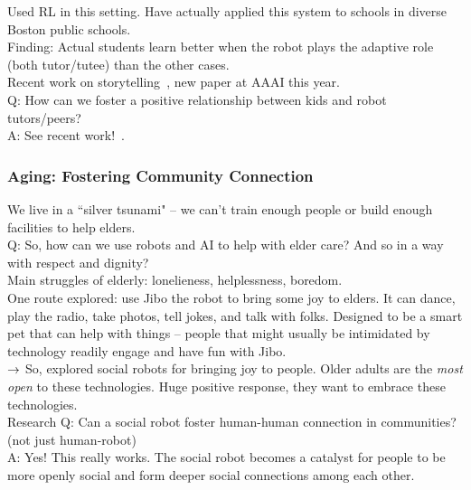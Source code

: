 Used RL in this setting. Have actually applied this system to schools in diverse Boston public schools. \\

Finding: Actual students learn better when the robot plays the adaptive role (both tutor/tutee) than the other cases. \\

Recent work on storytelling~\cite{park2017telling}, new paper at AAAI this year. \\

Q: How can we foster a positive relationship between kids and robot tutors/peers? \\

A: See recent work!~\cite{westlund2018measuring}.


\subsubsection{Aging: Fostering Community Connection}

We live in a ``silver tsunami" -- we can't train enough people or build enough facilities to help elders. \\

Q: So, how can we use robots and AI to help with elder care? And so in a way with respect and dignity? \\

Main struggles of elderly: lonelieness, helplessness, boredom. \\

One route explored: use Jibo the robot to bring some joy to elders. It can dance, play the radio, take photos, tell jokes, and talk with folks. Designed to be a smart pet that can help with things -- people that might usually be intimidated by technology readily engage and have fun with Jibo. \\

$\rightarrow$ So, explored social robots for bringing joy to people. Older adults are the {\it most open} to these technologies. Huge positive response, they want to embrace these technologies. \\

Research Q: Can a social robot foster human-human connection in communities? (not just human-robot) \\

A: Yes! This really works. The social robot becomes a catalyst for people to be more openly social and form deeper social connections among each other. \\

